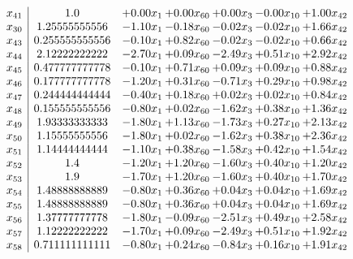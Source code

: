 \documentclass[8pt]{article}
\begin{document}
\[\begin{array}{c| c c@{\hskip 2pt} c@{\hskip 2pt} c@{\hskip 2pt} c@{\hskip 2pt} c@{\hskip 2pt} }
 x_{41}   &  1.0 & +  0.00 x_{1} & +  0.00 x_{60} & +  0.00 x_{3} & -0.00 x_{10} & +  1.00 x_{42}\\
 x_{30}   &  1.25555555556 & -1.10 x_{1} & -0.18 x_{60} & -0.02 x_{3} & -0.02 x_{10} & +  1.66 x_{42}\\
 x_{43}   &  0.255555555556 & -0.10 x_{1} & +  0.82 x_{60} & -0.02 x_{3} & -0.02 x_{10} & +  0.66 x_{42}\\
 x_{44}   &  2.12222222222 & -2.70 x_{1} & +  0.09 x_{60} & -2.49 x_{3} & +  0.51 x_{10} & +  2.92 x_{42}\\
 x_{45}   &  0.477777777778 & -0.10 x_{1} & +  0.71 x_{60} & +  0.09 x_{3} & +  0.09 x_{10} & +  0.88 x_{42}\\
 x_{46}   &  0.177777777778 & -1.20 x_{1} & +  0.31 x_{60} & -0.71 x_{3} & +  0.29 x_{10} & +  0.98 x_{42}\\
 x_{47}   &  0.244444444444 & -0.40 x_{1} & +  0.18 x_{60} & +  0.02 x_{3} & +  0.02 x_{10} & +  0.84 x_{42}\\
 x_{48}   &  0.155555555556 & -0.80 x_{1} & +  0.02 x_{60} & -1.62 x_{3} & +  0.38 x_{10} & +  1.36 x_{42}\\
 x_{49}   &  1.93333333333 & -1.80 x_{1} & +  1.13 x_{60} & -1.73 x_{3} & +  0.27 x_{10} & +  2.13 x_{42}\\
 x_{50}   &  1.15555555556 & -1.80 x_{1} & +  0.02 x_{60} & -1.62 x_{3} & +  0.38 x_{10} & +  2.36 x_{42}\\
 x_{51}   &  1.14444444444 & -1.10 x_{1} & +  0.38 x_{60} & -1.58 x_{3} & +  0.42 x_{10} & +  1.54 x_{42}\\
 x_{52}   &  1.4 & -1.20 x_{1} & +  1.20 x_{60} & -1.60 x_{3} & +  0.40 x_{10} & +  1.20 x_{42}\\
 x_{53}   &  1.9 & -1.70 x_{1} & +  1.20 x_{60} & -1.60 x_{3} & +  0.40 x_{10} & +  1.70 x_{42}\\
 x_{54}   &  1.48888888889 & -0.80 x_{1} & +  0.36 x_{60} & +  0.04 x_{3} & +  0.04 x_{10} & +  1.69 x_{42}\\
 x_{55}   &  1.48888888889 & -0.80 x_{1} & +  0.36 x_{60} & +  0.04 x_{3} & +  0.04 x_{10} & +  1.69 x_{42}\\
 x_{56}   &  1.37777777778 & -1.80 x_{1} & -0.09 x_{60} & -2.51 x_{3} & +  0.49 x_{10} & +  2.58 x_{42}\\
 x_{57}   &  1.12222222222 & -1.70 x_{1} & +  0.09 x_{60} & -2.49 x_{3} & +  0.51 x_{10} & +  1.92 x_{42}\\
 x_{58}   &  0.711111111111 & -0.80 x_{1} & +  0.24 x_{60} & -0.84 x_{3} & +  0.16 x_{10} & +  1.91 x_{42}\\

\end{array}\]
\end{document}
